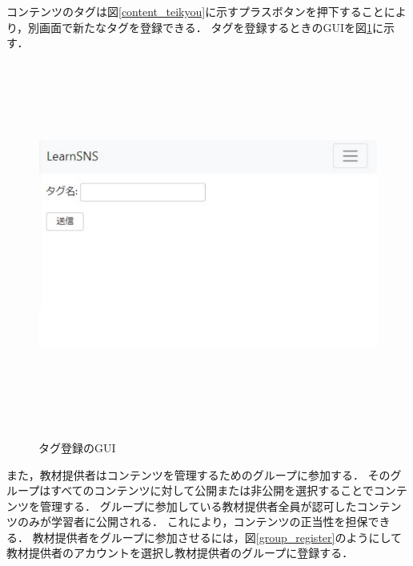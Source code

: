 \newpage
コンテンツのタグは図\ref{content_teikyou}に示すプラスボタンを押下することにより，別画面で新たなタグを登録できる．
タグを登録するときのGUIを図\ref{tag}に示す．
\begin{figure}[htbp]
    \begin{center}
        \includegraphics[width=13cm,height=12cm,keepaspectratio]{tag-crop.pdf}\\
    \end{center}
    \caption{タグ登録のGUI}
    \label{tag}
\end{figure}

\newpage
また，教材提供者はコンテンツを管理するためのグループに参加する．
そのグループはすべてのコンテンツに対して公開または非公開を選択することでコンテンツを管理する．
グループに参加している教材提供者全員が認可したコンテンツのみが学習者に公開される．
これにより，コンテンツの正当性を担保できる．
教材提供者をグループに参加させるには，図\ref{group_register}のようにして教材提供者のアカウントを選択し教材提供者のグループに登録する．


